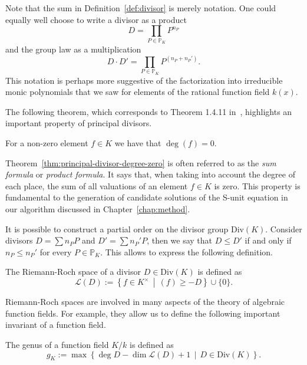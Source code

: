 Note that the sum in Definition~\ref{def:divisor} is merely notation. One could equally well choose to write a divisor as a product
\[D = \prod_{P \in \mathbb{P}_{K}} P^{n_{P}}\]
and the group law as a multiplication
\[D \cdot D' = \prod_{P \in \mathbb{P}_{K}} P^{\left(n_{P} + n_{P}'\right)}.\]
This notation is perhaps more suggestive of the factorization into irreducible monic polynomials that we saw for elements of the rational function field \(k(x)\).

The following theorem, which corresponds to Theorem 1.4.11 in~\cite{stichtenoth-2009-algebraic-function-fields}, highlights an important property of principal divisors.

\begin{theorem}%
  \label{thm:principal-divisor-degree-zero}
  For a non-zero element \(f \in K\) we have that \(\deg{(f)} = 0\).
\end{theorem}

Theorem~\ref{thm:principal-divisor-degree-zero} is often referred to as the \textit{sum formula} or \textit{product formula}. It says that, when taking into account the degree of each place, the sum of all valuations of an element \(f \in K\) is zero. This property is fundamental to the generation of candidate solutions of the S-unit equation in our algorithm discussed in Chapter~\ref{chap:method}.

It is possible to construct a partial order on the divisor group \(\mathrm{Div}(K)\). Consider divisors \({D = \sum n_{P}P}\) and \({D' = \sum n_{P}'P}\), then we say that \(D \leq D'\) if and only if \(n_{P} \leq n_{P}'\) for every \(P \in \mathbb{P}_{K}\). This allows to express the following definition.

\begin{definition}%
  \label{def:riemann-roch-space}
  The Riemann-Roch space of a divisor \(D \in \mathrm{Div}(K)\) is defined as
  \[\mathcal{L}(D) := \left\{ f \in K^{\times} \,\middle|\, (f) \geq -D \right\} \cup \{0\}.\]
\end{definition}

Riemann-Roch spaces are involved in many aspects of the theory of algebraic function fields. For example, they allow us to define the following important invariant of a function field.

\begin{definition}%
  \label{def:genus}
  The genus of a function field \(K / k\) is defined as
  \[g_{K} := \max{\left\{ \deg{D} - \dim{\mathcal{L}(D)} + 1 \,\middle|\, D \in \mathrm{Div}(K) \right\}}.\]
\end{definition}

